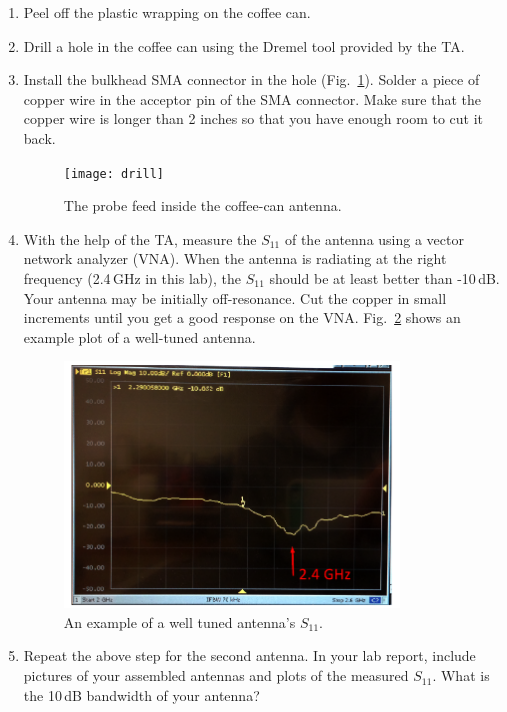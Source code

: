 \documentclass[letterpaper, 11pt]{article}
\begin{document}
\begin{enumerate}
	\item Peel off the plastic wrapping on the coffee can. 

	\item Drill a hole in the coffee can using the Dremel tool provided by the TA. 
	\item Install the bulkhead SMA connector in the hole (Fig.~\ref{fig:drill}). Solder a piece of copper wire in the acceptor pin of the SMA connector. Make sure that the copper wire is longer than 2 inches so that you have enough room to cut it back.
	
		\begin{figure}[ht]
			\centering	
			\texttt{[image: drill]}
			\caption{The probe feed inside the coffee-can antenna.}
			\label{fig:drill}
		\end{figure}
	 
	
	\item With the help of the TA, measure the $S_{11}$ of the antenna using a vector network analyzer (VNA). When the antenna is radiating at the right frequency (2.4\,GHz in this lab), the $S_{11}$ should be at least better than -10\,dB. Your antenna may be initially off-resonance. Cut the copper in small increments until you get a good response on the VNA. Fig.~\ref{fig:s11} shows an example plot of a well-tuned antenna. 
		\begin{figure}[ht]
			\centering	
			\includegraphics[width=3.5in]{s11}
			\caption{An example of a well tuned antenna's $S_{11}$.}
			\label{fig:s11}
		\end{figure}

	\item Repeat the above step for the second antenna. In your lab report, include pictures of your assembled antennas and plots of the measured $S_{11}$. What is the 10\,dB bandwidth of your antenna?  
		
\end{enumerate}
\end{document}

